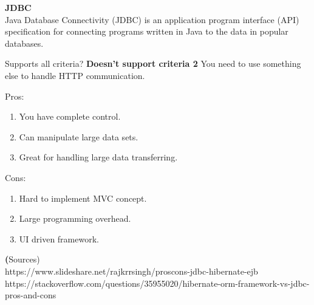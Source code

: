 		\textbf{JDBC} \\
		Java Database Connectivity (JDBC) is an application program interface (API) specification for connecting programs written in Java to the data in popular databases.
		
		Supports all criteria?
		\textbf{Doesn't support criteria 2}
		You need to use something else to handle HTTP communication.
		
		Pros:
		\begin{enumerate}
			\item You have complete control.
			\item Can manipulate large data sets.
			\item Great for handling large data transferring.
		\end{enumerate}
		Cons:
		\begin{enumerate}
			\item Hard to implement MVC concept.
			\item Large programming overhead.
			\item UI driven framework.
		\end{enumerate}
	
	\textbf(Sources)\\
	https://www.slideshare.net/rajkrrsingh/proscons-jdbc-hibernate-ejb \\
	https://stackoverflow.com/questions/35955020/hibernate-orm-framework-vs-jdbc-pros-and-cons \\